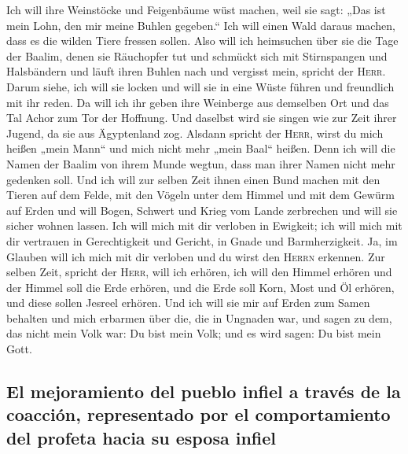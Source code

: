  Ich will ihre Weinstöcke und Feigenbäume wüst machen,
weil sie sagt: „Das ist mein Lohn, den mir meine Buhlen gegeben.`` Ich
will einen Wald daraus machen, dass es die wilden Tiere fressen sollen.
 Also will ich heimsuchen über sie die Tage der Baalim,
denen sie Räuchopfer tut und schmückt sich mit Stirnspangen und
Halsbändern und läuft ihren Buhlen nach und vergisst mein, spricht der
\textsc{Herr}.  Darum siehe, ich will sie locken und will
sie in eine Wüste führen und freundlich mit ihr reden. 
Da will ich ihr geben ihre Weinberge aus demselben Ort und das Tal Achor
zum Tor der Hoffnung. Und daselbst wird sie singen wie zur Zeit ihrer
Jugend, da sie aus Ägyptenland zog.  Alsdann spricht der
\textsc{Herr}, wirst du mich heißen „mein Mann`` und mich nicht mehr
„mein Baal`` heißen.  Denn ich will die Namen der Baalim
von ihrem Munde wegtun, dass man ihrer Namen nicht mehr gedenken soll.
 Und ich will zur selben Zeit ihnen einen Bund machen mit
den Tieren auf dem Felde, mit den Vögeln unter dem Himmel und mit dem
Gewürm auf Erden und will Bogen, Schwert und Krieg vom Lande zerbrechen
und will sie sicher wohnen lassen.  Ich will mich mit dir
verloben in Ewigkeit; ich will mich mit dir vertrauen in Gerechtigkeit
und Gericht, in Gnade und Barmherzigkeit.  Ja, im Glauben
will ich mich mit dir verloben und du wirst den \textsc{Herrn} erkennen.
 Zur selben Zeit, spricht der \textsc{Herr}, will ich
erhören, ich will den Himmel erhören und der Himmel soll die Erde
erhören,  und die Erde soll Korn, Most und Öl erhören,
und diese sollen Jesreel erhören.  Und ich will sie mir
auf Erden zum Samen behalten und mich erbarmen über die, die in Ungnaden
war, und sagen zu dem, das nicht mein Volk war: Du bist mein Volk; und
es wird sagen: Du bist mein Gott.

\hypertarget{el-mejoramiento-del-pueblo-infiel-a-travuxe9s-de-la-coacciuxf3n-representado-por-el-comportamiento-del-profeta-hacia-su-esposa-infiel}{%
\subsection{El mejoramiento del pueblo infiel a través de la coacción,
representado por el comportamiento del profeta hacia su esposa
infiel}\label{el-mejoramiento-del-pueblo-infiel-a-travuxe9s-de-la-coacciuxf3n-representado-por-el-comportamiento-del-profeta-hacia-su-esposa-infiel}}

